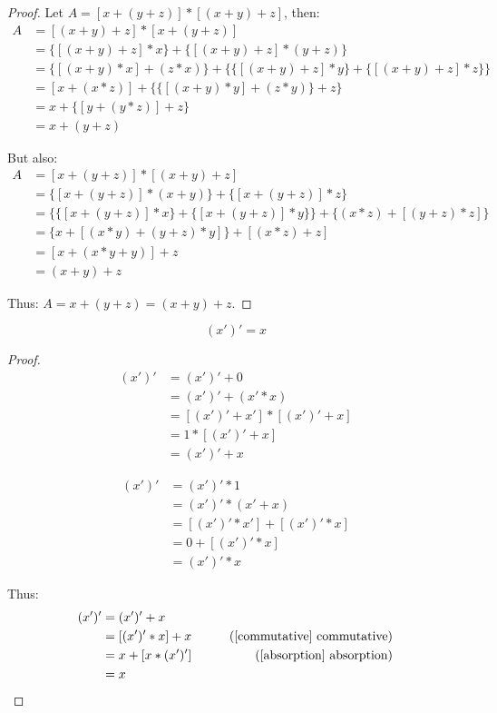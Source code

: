 \begin{proof}
Let $A = [x + (y + z)] * [(x + y) + z]$, then:
\begin{align*}
A & = [(x + y) + z] * [x + (y + z)] \\
  & = \{[(x + y) + z] * x\} + \{[(x + y) + z] * (y + z)\} \\
  & = \{[(x + y) * x] + (z * x)\} + \{ \{[(x + y) + z] * y\} + \{[(x + y) + z] * z\} \} \\
  & = [x + (x * z)] + \{\{[(x + y) * y] + (z * y)\} + z\} \\
  & = x + \{[y + (y * z)] + z\} \\
  & = x + (y + z)
\end{align*}

But also:
\begin{align*}
A & = [x + (y + z)] * [(x + y) + z] \\
  & = \{[x + (y + z)] * (x + y)\} + \{[x + (y + z)] * z\} \\
  & = \{\{[x + (y + z)] * x\} + \{[x + (y + z)] * y\}\} + \{(x * z) + [(y + z) * z]\}\\
  & = \{x + [(x * y) + (y + z) * y]\} + [(x * z) + z]\\
  & = [x + (x * y + y)] + z\\
  & = (x + y) + z
\end{align*}

Thus:
$A = x + (y + z) = (x + y) + z$.
\end{proof}

\newpage
\begin{theorem}
\label{involutioin}
\[ (x')' = x \]
\end{theorem}

\begin{proof}
\begin{align*}
(x')' & = (x')' + 0 \\
      & = (x')' + (x' * x) \\
      & = [(x')' + x'] * [(x')' + x] \\
      & = 1 * [(x')' + x] \\
      & = (x')' + x
\end{align*}

\begin{align*}
(x')' & = (x')' * 1 \\
      & = (x')' * (x' + x) \\
      & = [(x')' * x'] + [(x')' * x] \\
      & = 0 + [(x')' * x] \\
      & = (x')' * x
\end{align*}

Thus:
\begin{align*}
(x')' & = (x')' + x \\
      & = [(x')' * x] + x & \tag{\ref{commutative} commutative} \\
      & = x + [x * (x')'] & \tag{\ref{absorption} absorption} \\
      & = x
\end{align*}

\end{proof}


